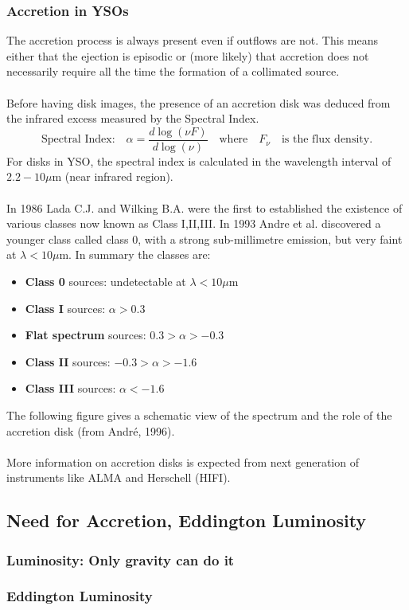 \documentclass[10pt,a4paper]{article}
\begin{document}
\subsubsection{Accretion in YSOs}
The accretion process is always present even if outflows are not. This means either that the ejection is episodic or (more likely) that accretion does not necessarily require all the time the formation of a collimated source.\\
\\
Before having disk images, the presence of an accretion disk was deduced from the infrared excess measured by the Spectral Index.
\[\text{Spectral Index:}\quad \alpha=\frac{d\log(\nu F)}{d \log(\nu)}\quad\text{where}\quad F_{\nu}\quad\text{is the flux density.}\]
For disks in YSO, the spectral index is calculated in the wavelength interval of $2.2-10 \mu$m (near infrared region).\\
\\
In 1986 Lada C.J. and Wilking B.A. were the first to established the existence of various classes now known as Class I,II,III. In 1993 Andre et al. discovered a younger class called class 0, with a strong sub-millimetre emission, but very faint at $\lambda<10\mu$m. In summary the classes are:
\begin{itemize}
\item \textbf{Class 0} sources: undetectable at $\lambda<10\mu$m
\item \textbf{Class I} sources: $\alpha>0.3$
\item \textbf{Flat spectrum} sources: $0.3>\alpha>-0.3$
\item \textbf{Class II} sources: $-0.3>\alpha>-1.6$
\item \textbf{Class III} sources: $\alpha<-1.6$
\end{itemize}
The following figure gives a schematic view of the spectrum and the role of the accretion disk (from André, 1996).\\
\\
More information on accretion disks is expected from next generation of instruments like ALMA and Herschell (HIFI).
\subsection{Need for Accretion, Eddington Luminosity}
\subsubsection{Luminosity: Only gravity can do it}
\subsubsection{Eddington Luminosity}
\end{document}
